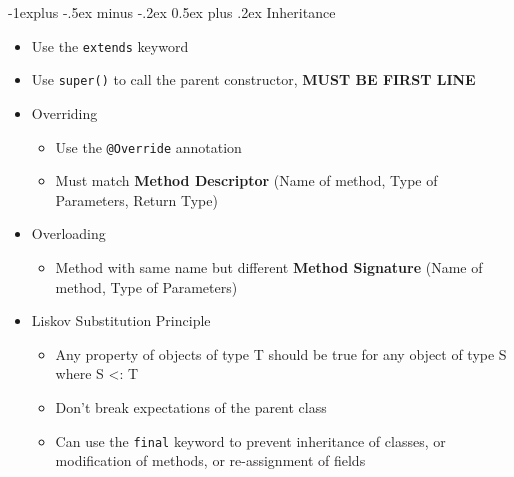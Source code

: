 \documentclass[10pt, landscape]{article}
\makeatletter
\renewcommand{\section}{\@startsection{section}{1}{0mm}%
                                {-1ex plus -.5ex minus -.2ex}%
                                {0.5ex plus .2ex}%
                                {\normalfont\large\bfseries}}
\renewcommand{\section}{\@startsection{section}{2}{0mm}%
                                {-1explus -.5ex minus -.2ex}%
                                {0.5ex plus .2ex}%
                                {\normalfont\normalsize\bfseries}}
\makeatother
\begin{document}
\begin{multicols*}{4}
\section{Inheritance}
\begin{itemize}
    \item Use the \lstinline{extends} keyword
    \item Use \lstinline{super()} to call the parent constructor, \textbf{MUST BE FIRST LINE}
    \item Overriding
    \begin{itemize}
        \item Use the \lstinline{@Override} annotation
        \item Must match \textbf{Method Descriptor} (Name of method, Type of Parameters, Return Type)
    \end{itemize}
    \item Overloading
    \begin{itemize}
        \item Method with same name but different \textbf{Method Signature} (Name of method, Type of Parameters)
    \end{itemize}
    \item Liskov Substitution Principle
    \begin{itemize}
        \item Any property of objects of type T should be true for any object of type S where S <: T
        \item Don't break expectations of the parent class
        \item Can use the \lstinline{final} keyword to prevent inheritance of classes, or modification of methods, or re-assignment of fields
    \end{itemize}
\end{itemize}


\end{multicols*}
\end{document}
